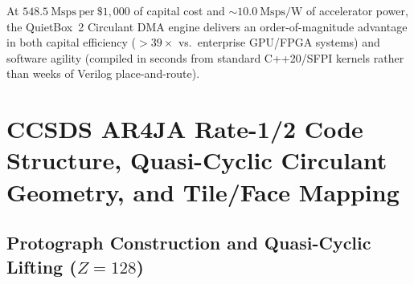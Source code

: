 \documentclass[10pt]{article}
\begin{document}
At $\mathbf{548.5\ \mathrm{Msps\ per\ \$1,000}}$ of capital cost and $\mathbf{\sim 10.0\ \mathrm{Msps/W}}$ of accelerator power, the QuietBox~2 Circulant DMA engine delivers an order-of-magnitude advantage in both capital efficiency ($>39\times$ vs.\ enterprise GPU/FPGA systems) and software agility (compiled in seconds from standard C++20/SFPI kernels rather than weeks of Verilog place-and-route).

\section{CCSDS AR4JA Rate-1/2 Code Structure, Quasi-Cyclic Circulant Geometry, and Tile/Face Mapping}
\label{sec:code_structure}

\subsection{Protograph Construction and Quasi-Cyclic Lifting ($Z = 128$)}
\end{document}
